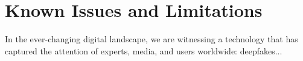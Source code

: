 \documentclass[main.tex]{subfiles}
\begin{document}
\section{Known Issues and Limitations}\label{sec:issue_limitations}
In the ever-changing digital landscape, we are witnessing a technology that has captured the attention of experts, media, and users worldwide: deepfakes...
\end{document}
